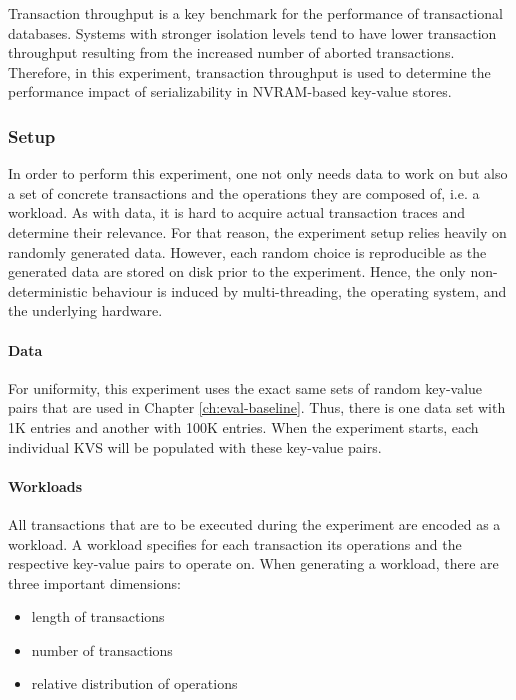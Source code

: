 Transaction throughput is a key benchmark for the performance of transactional
databases. Systems with stronger isolation levels tend to have lower transaction
throughput resulting from the increased number of aborted transactions.
Therefore, in this experiment, transaction throughput is used to determine the
performance impact of serializability in NVRAM-based key-value stores.

\subsubsection{Setup}


In order to perform this experiment, one not only needs data to work on but also
a set of concrete transactions and the operations they are composed of, i.e. a
workload. As with data, it is hard to acquire actual transaction traces and
determine their relevance. For that reason, the experiment setup relies heavily
on randomly generated data. However, each random choice is reproducible as the
generated data are stored on disk prior to the experiment. Hence, the only
non-deterministic behaviour is induced by multi-threading, the operating system,
and the underlying hardware.

\paragraph{Data}

For uniformity, this experiment uses the exact same sets of random key-value
pairs that are used in Chapter \ref{ch:eval-baseline}. Thus, there is one data
set with 1K entries and another with 100K entries. When the experiment starts,
each individual KVS will be populated with these key-value pairs.

\paragraph{Workloads}

All transactions that are to be executed during the experiment are encoded as a
workload. A workload specifies for each transaction its operations and the
respective key-value pairs to operate on. When generating a workload, there are
three important dimensions:

\begin{itemize}
    \item length of transactions
    \item number of transactions
    \item relative distribution of operations
\end{itemize}

